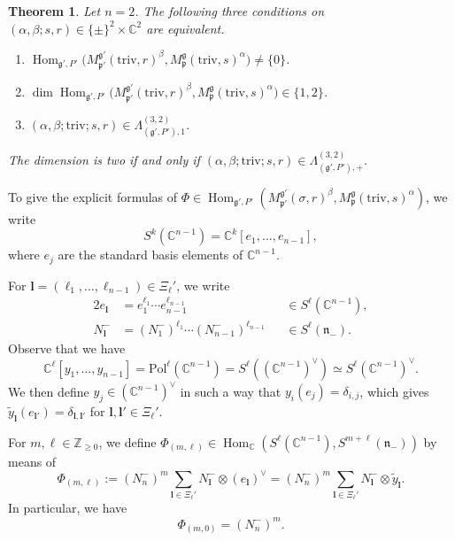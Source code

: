 \documentclass[reqno,11pt]{amsart}
\newtheorem{thm}[equation]{Theorem}
\theoremstyle{remark}
\theoremstyle{definition}
\numberwithin{equation}{section}
\newcommand{\gb}{\beta}
\newcommand{\ga}{\alpha}
\newcommand{\gL}{\Lambda}
\newcommand{\fg}{{\mathfrak g}}
\newcommand{\fn}{{\mathfrak n}}
\newcommand{\fp}{{\mathfrak p}}
\newcommand{\C}{\mathbb{C}}
\newcommand{\Z}{\mathbb{Z}}
\newcommand{\Hom}{\operatorname{Hom}}
\newcommand{\Pol}{\mathrm{Pol}}
\newcommand{\triv}{\mathrm{triv}}
\newcommand{\Mp}{M^{\fg}_{\fp}}
\newcommand{\Mpp}{M^{\fg'}_{\fp'}}
\begin{document}
\begin{thm}\label{thm:Hom1b}
Let $n =2$. The following three conditions on 
$(\alpha,\beta; s, r) \in \{\pm\}^2\times  \C^2$
are equivalent.
\begin{enumerate}
\item[\emph{(i)}] 
$\Hom_{\fg',P'}\big(\Mpp(\triv,r)^\gb, \Mp(\triv, s)^\ga\big)\neq \{0\}$.
\item[\emph{(ii)}] 
$\dim \Hom_{\fg', P'}\big(\Mpp(\triv,r)^\gb, \Mp(\triv, s)^\ga\big) \in \{1,2\}$.
\item[\emph{(iii)}] 
$(\alpha,\beta; \triv; s, r) \in \gL^{(3,2)}_{(\fg',P'),1}$.
\end{enumerate}
The dimension is two if and only if 
$(\alpha,\beta; \triv; s, r) \in \gL^{(3,2)}_{(\fg',P'),+}$.
\end{thm}

To give the explicit formulas of 
$\Phi\in \Hom_{\fg',P'}(\Mpp(\sigma,r)^\gb, \Mp(\triv, s)^\ga)$,
we write
\begin{equation*}
S^k(\C^{n-1}) = \C^k[e_1, \ldots, e_{n-1}],
\end{equation*}
where $e_j$ are the standard basis elements of $\C^{n-1}$. 

For $\mathbf{l} = (\ell_1, \ldots, \ell_{n-1})\in \Xi_\ell'$, we write
\begin{alignat*}{2}
e_{\mathbf{l}} &= e_1^{\ell_1} \cdots e_{n-1}^{\ell_{n-1}} &&\in S^\ell(\C^{n-1}),\\
N_{\mathbf{l}}^- &= (N_1^-)^{\ell_1} \cdots (N_{n-1}^-)^{\ell_{n-1}}
&&\in S^\ell(\fn_-).
\end{alignat*}
\noindent
Observe that we have 
\begin{equation*}
\C^\ell[y_1, \ldots, y_{n-1}] 
= \Pol^\ell(\C^{n-1}) = S^\ell((\C^{n-1})^\vee)\simeq S^\ell(\C^{n-1})^\vee.
\end{equation*}
We then define $y_j\in (\C^{n-1})^\vee$ in such a way that  $y_i(e_j) = \delta_{i,j}$,
which gives 
$\widetilde{y}_{\mathbf{l}}(e_{\mathbf{l}'})=\delta_{\mathbf{l},\mathbf{l}'}$
for $\mathbf{l},\mathbf{l}' \in \Xi_\ell'$.

For $m, \ell \in \Z_{\geq 0}$, 
we define $\Phi_{(m,\ell)} \in 
\Hom_\C(S^\ell(\C^{n-1}), S^{m+\ell}(\fn_-))$ by means of
\begin{equation}\label{eqn:Hom}
\Phi_{(m,\ell)}
:= 
(N_n^-)^m
\sum_{\mathbf{l} \in \Xi_\ell'} 
N_{\mathbf{l}}^-
\otimes 
(e_{\mathbf{l}})^\vee
= 
(N_n^-)^m
\sum_{\mathbf{l} \in \Xi_\ell'} 
N_{\mathbf{l}}^-
\otimes 
\widetilde{y}_{\mathbf{l}}.
\end{equation}
In particular, we have 
\begin{equation*}
\Phi_{(m,0)}
= (N_n^-)^m.
\end{equation*}
\end{document}
